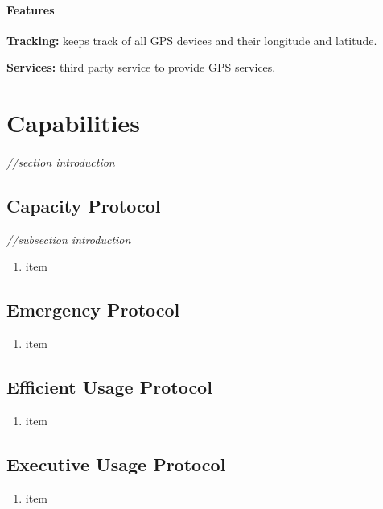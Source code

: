 \documentclass[12pt]{article}
\begin{document}
	\paragraph{Features}
	\begin{list}{}{}
		\item \textbf{Tracking: }keeps track of all GPS devices and their longitude and latitude.
        \item \textbf{Services: }third party service to provide GPS services. 
	\end{list}

\section{Capabilities}
\label{cap}
\paragraph{}\textit{//section introduction}
	\subsection{Capacity Protocol} \textit{//subsection introduction}
	\begin{enumerate}
		\item item
	\end{enumerate}

	\subsection{Emergency Protocol}
	\begin{enumerate}
		\item item
	\end{enumerate}

	\subsection{Efficient Usage Protocol}
	\begin{enumerate}
		\item item
	\end{enumerate}

	\subsection{Executive Usage Protocol}
	\begin{enumerate}
		\item item
	\end{enumerate}
\end{document}
